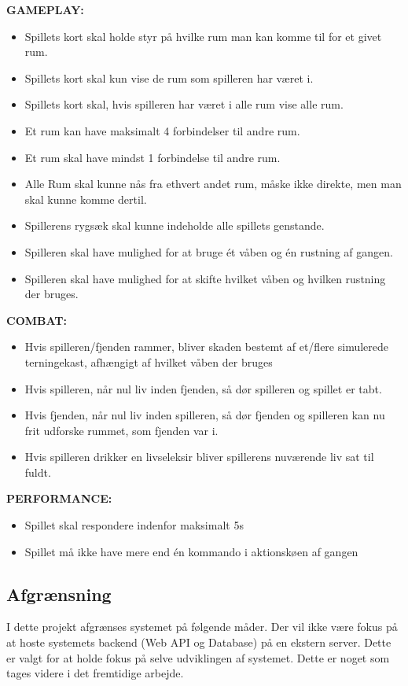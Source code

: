 \textbf{GAMEPLAY:}
\begin{itemize}
  \item Spillets kort skal holde styr på hvilke rum man kan komme til for et givet rum.
  \item Spillets kort skal kun vise de rum som spilleren har været i.
  \item Spillets kort skal, hvis spilleren har været i alle rum vise alle rum.
  \item Et rum kan have maksimalt 4 forbindelser til andre rum.
  \item Et rum skal have mindst 1 forbindelse til andre rum.
  \item Alle Rum skal kunne nås fra ethvert andet rum, måske ikke direkte, men man skal kunne komme dertil.
  \item Spillerens rygsæk skal kunne indeholde alle spillets genstande.
  \item Spilleren skal have mulighed for at bruge ét våben og én rustning af gangen.
  \item Spilleren skal have mulighed for at skifte hvilket våben og hvilken rustning der bruges.
\end{itemize}
    
\textbf{COMBAT:}

\begin{itemize}
  \item Hvis spilleren/fjenden rammer, bliver skaden bestemt af et/flere simulerede terningekast, afhængigt af hvilket våben der bruges
  \item Hvis spilleren, når nul liv inden fjenden, så dør spilleren og spillet er tabt.
  \item Hvis fjenden, når nul liv inden spilleren, så dør fjenden og spilleren kan nu frit udforske rummet, som fjenden var i.
  \item Hvis spilleren drikker en livseleksir bliver spillerens nuværende liv sat til fuldt.
\end{itemize}

\textbf{PERFORMANCE:}    

\begin{itemize}
  \item Spillet skal respondere indenfor maksimalt 5s
  \item Spillet må ikke have mere end én kommando i aktionskøen af gangen
\end{itemize}

\newpage

\subsection{Afgrænsning}
I dette projekt afgrænses systemet på følgende måder. Der vil ikke være fokus på at hoste systemets backend (Web API og Database) på en ekstern server.
Dette er valgt for at holde fokus på selve udviklingen af systemet. Dette er noget som tages videre i det fremtidige arbejde.  

